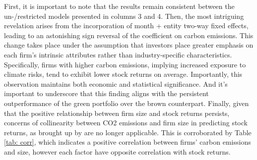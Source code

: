 \documentclass[12pt]{article}
\begin{document}
First, it is important to note that the results remain consistent between the un-/restricted models presented in columns 3 and 4. Then, the most intriguing revelation arises from the incorporation of month + entity two-way fixed effects, leading to an astonishing sign reversal of the coefficient on carbon emissions. This change takes place under the assumption that investors place greater emphasis on each firm's intrinsic attributes rather than industry-specific characteristics. Specifically, firms with higher carbon emissions, implying increased exposure to climate risks, tend to exhibit lower stock returns on average. Importantly, this observation maintains both economic and statistical significance. And it's important to underscore that this finding aligns with the persistent outperformance of the green portfolio over the brown counterpart. Finally, given that the positive relationship between firm size and stock returns persists, concerns of collinearity between CO2 emissions and firm size in predicting stock returns, as brought up by \cite{aswani2023carbon} are no longer applicable. This is corroborated by Table \ref{tab: corr}, which indicates a positive correlation between firms' carbon emissions and size, however each factor have opposite correlation with stock returns.
\end{document}
